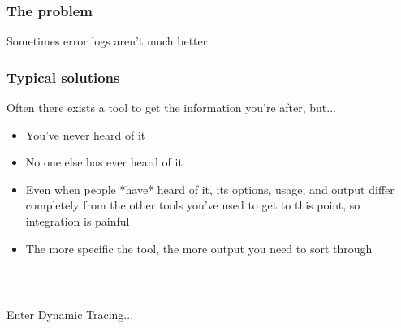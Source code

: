 \documentclass{beamer}
\begin{document}
\begin{frame}
    \frametitle{The problem}
    Sometimes error logs aren't much better
    \begin{figure}[b]
    \begin{centering}
    \end{centering}
    \end{figure}
\end{frame}

\begin{frame}
    \frametitle{Typical solutions}
    Often there exists a tool to get the information you're after, but...
    \begin{itemize}
        \item<2->You've never heard of it
        \item<3->No one else has ever heard of it
        \item<4->Even when people *have* heard of it, its options, usage, and output differ completely from the other tools you've used to get to this point, so integration is painful
        \item<5->The more specific the tool, the more output you need to sort through
    \end{itemize}
\end{frame}

\begin{frame}
    \frametitle{~}
    \begin{center}
    Enter Dynamic Tracing...
    \end{center}
\end{frame}
\end{document}
